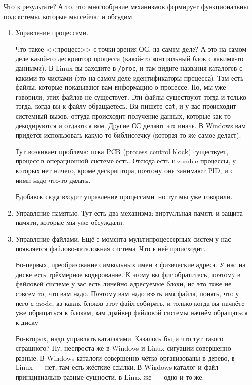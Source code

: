 \documentclass{article}
\begin{document}
    Что в результате? А то, что многообразие механизмов формирует функциональны подсистемы, которые мы сейчас и обсудим.
    \begin{enumerate}
        \item Управление процессами.
        
        Что такое <<процесс>> с точки зрения ОС, на самом деле? А это на самом деле какой-то дескриптор процесса (какой-то контрольный блок с какими-то данными). В Linux вы заходите в \texttt{/proc}, и там видите названия каталогов с какими-то числами (это на самом деле идентификаторы процесса). Там есть файлы, которые показывают вам информацию о процессе. Но, мы уже говорили, этих файлов не существует. Эти файлы существуют тогда и только тогда, когда вы к файлу обращаетесь. Вы пишете \texttt{cat}, и у вас происходит системный вызов, оттуда происходит получение данных, которые как-то декодируются и отдаются вам. Другие ОС делают это иначе. В Windows вам придётся использовать какую-то библиотечку (которая то же самое делает).
        
        Тут возникает проблема: пока PCB (process control block) существует, процесс в операционной системе есть. Отсюда есть и zombie-процессы, у которых нет ничего, кроме дескриптора, поэтому они занимают PID, и с ними надо что-то делать.
        
        Вдобавок сюда входит управление процессами, но тут мы уже говорили.
        
        \item Управление памятью. Тут есть два механизма: виртуальная память и защита памяти, которые мы уже обсуждали.
        
        \item Управление файлами. Ещё с момента мультипроцессорных систем у нас появляется файлово-каталожная система. Что в неё происходит.
        
        Во-первых, преобразование символьных имён в физические адреса. У нас на диске есть трёхмерное кодирование. К этому вы фиг обратитесь, поэтому в файловой системе у вас есть линейно адресуемые блоки, но это тоже не совсем то, что вам надо. Поэтому вам надо взять имя файла, понять, что у него с inode, из каких блоков этот файл собирать, и только когда вы начнёте уже обращаться к блокам, вам драйвер файловой системы начнём обращаться к диску.
        
        Во-вторых, надо управлять каталогами. Казалось бы, а что тут такого страшного? Ну, неспроста же в Windows и Linux ситуации совершенно разные. В Windows каталоги совершенно чётко организованы в дерево, в Linux~--- нет, там есть жёсткие ссылки. В Windows каталог и файл~--- принципиально разные сущности, в Linux же~--- одно и то же.
        

\end{enumerate}
\end{document}
